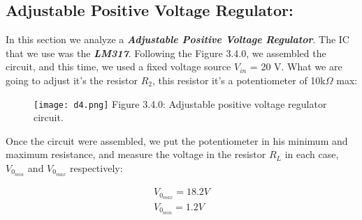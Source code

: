 \subsection{Adjustable Positive Voltage Regulator:}

In this section we analyze a {\bfseries\itshape Adjustable Positive Voltage Regulator}. The IC that we use was the {\bfseries\itshape LM317}. Following the Figure 3.4.0, we assembled the circuit, and this time, we used a fixed voltage source $V_{in}$ = 20 V. What we are going to adjust it's the resistor $R_{2}$, this resistor it's a potentiometer of 10k$\Omega$ max:

\begin{figure}[H]
\texttt{[image: d4.png]}
\centering \linebreak \linebreak Figure 3.4.0: Adjustable positive voltage regulator circuit.
\end{figure}

Once the circuit were assembled, we put the potentiometer in his minimum and maximum resistance, and measure the voltage in the resistor $R_{L}$ in each case, $V_{0_{min}}$ and $V_{0_{max}}$ respectively: \hfill \break

{\bfseries\itshape\color{armygreen}{Observation:}} {\itshape{}} \hfill

\begin{ceqn}
\begin{align}
V_{0_{max}} = 18.2 V \\
V_{0_{min}} = 1.2 V
\end{align}
\end{ceqn}

\pagebreak